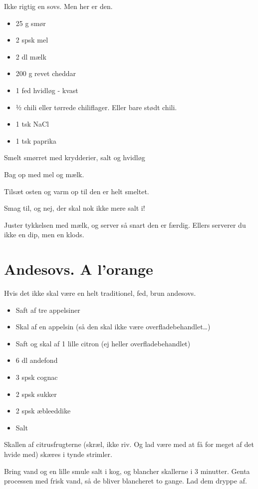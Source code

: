 \documentclass[
  letterpaper,
  DIV=11,
  numbers=noendperiod]{scrreprt}
\providecommand{\tightlist}{%
  \setlength{\itemsep}{0pt}\setlength{\parskip}{0pt}}\usepackage{longtable,booktabs,array}
\begin{document}
Ikke rigtig en sovs. Men her er den.

\begin{itemize}
\tightlist
\item
  25 g smør
\item
  2 spsk mel
\item
  2 dl mælk
\item
  200 g revet cheddar
\item
  1 fed hvidløg - kvast
\item
  ½ chili eller tørrede chiliflager. Eller bare stødt chili.
\item
  1 tsk NaCl
\item
  1 tsk paprika
\end{itemize}

Smelt smørret med krydderier, salt og hvidløg

Bag op med mel og mælk.

Tilsæt osten og varm op til den er helt smeltet.

Smag til, og nej, der skal nok ikke mere salt i!

Juster tykkelsen med mælk, og server så snart den er færdig. Ellers
serverer du ikke en dip, men en klods.

\hypertarget{andesovs.-a-lorange}{%
\section{Andesovs. A l'orange}\label{andesovs.-a-lorange}}

Hvis det ikke skal være en helt traditionel, fed, brun andesovs.

\begin{itemize}
\tightlist
\item
  Saft af tre appelsiner
\item
  Skal af en appelsin (så den skal ikke være overfladebehandlet\ldots)
\item
  Saft og skal af 1 lille citron (ej heller overfladebehandlet)
\item
  6 dl andefond
\item
  3 spsk cognac
\item
  2 spsk sukker
\item
  2 spsk æbleeddike
\item
  Salt
\end{itemize}

Skallen af citrusfrugterne (skræl, ikke riv. Og lad være med at få for
meget af det hvide med) skæres i tynde strimler.

Bring vand og en lille smule salt i kog, og blancher skallerne i 3
minutter. Genta processen med frisk vand, så de bliver blancheret to
gange. Lad dem dryppe af.
\end{document}
